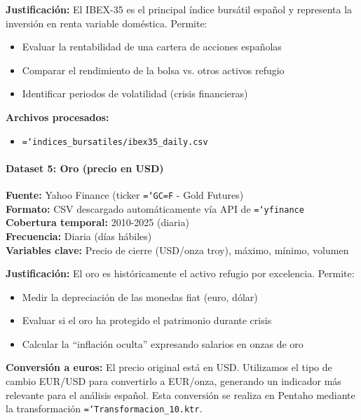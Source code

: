 \documentclass{article}
\let\oldtexttt\texttt  %
\renewcommand{\texttt}[1]{{\footnotesize\oldtexttt{\hyphenchar\font=`\-#1}}}  %
\begin{document}
\textbf{Justificaci\'on:} El IBEX-35 es el principal \'indice burs\'atil espa\~nol y representa la inversi\'on en renta variable dom\'estica. Permite:
\begin{itemize}
    \item Evaluar la rentabilidad de una cartera de acciones espa\~nolas
    \item Comparar el rendimiento de la bolsa vs. otros activos refugio
    \item Identificar periodos de volatilidad (crisis financieras)
\end{itemize}

\textbf{Archivos procesados:}
\begin{itemize}
    \item \texttt{indices\_bursatiles/ibex35\_daily.csv}
\end{itemize}

\paragraph{Dataset 5: Oro (precio en USD)}

\textbf{Fuente:} Yahoo Finance (ticker \texttt{GC=F} - Gold Futures)\\
\textbf{Formato:} CSV descargado autom\'aticamente v\'ia API de \texttt{yfinance}\\
\textbf{Cobertura temporal:} 2010-2025 (diaria)\\
\textbf{Frecuencia:} Diaria (d\'ias h\'abiles)\\
\textbf{Variables clave:} Precio de cierre (USD/onza troy), m\'aximo, m\'inimo, volumen

\textbf{Justificaci\'on:} El oro es hist\'oricamente el activo refugio por excelencia. Permite:
\begin{itemize}
    \item Medir la depreciaci\'on de las monedas fiat (euro, d\'olar)
    \item Evaluar si el oro ha protegido el patrimonio durante crisis
    \item Calcular la ``inflaci\'on oculta'' expresando salarios en onzas de oro
\end{itemize}

\textbf{Conversi\'on a euros:} El precio original est\'a en USD. Utilizamos el tipo de cambio EUR/USD para convertirlo a EUR/onza, generando un indicador m\'as relevante para el an\'alisis espa\~nol. Esta conversi\'on se realiza en Pentaho mediante la transformaci\'on \texttt{Transformacion\_10.ktr}.
\end{document}
